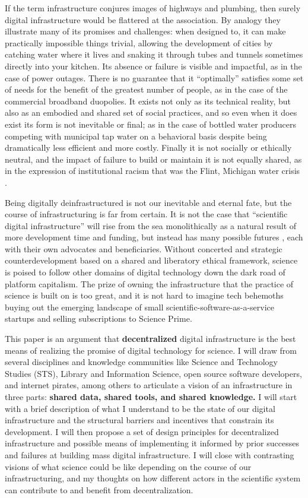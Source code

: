 \documentclass[notoc]{tufte-book}
\begin{document}
If the term infrastructure conjures images of highways and plumbing,
then surely digital infrastructure would be flattered at the
association. By analogy they illustrate many of its promises and
challenges: when designed to, it can make practically impossible things
trivial, allowing the development of cities by catching water where it
lives and snaking it through tubes and tunnels sometimes directly into
your kitchen. Its absence or failure is visible and impactful, as in the
case of power outages. There is no guarantee that it ``optimally''
satisfies some set of needs for the benefit of the greatest number of
people, as in the case of the commercial broadband duopolies. It exists
not only as its technical reality, but also as an embodied and shared
set of social practices, and so even when it does exist its form is not
inevitable or final; as in the case of bottled water producers competing
with municipal tap water on a behavioral basis despite being
dramatically less efficient and more costly. Finally it is not socially
or ethically neutral, and the impact of failure to build or maintain it
is not equally shared, as in the expression of institutional racism that
was the Flint, Michigan water crisis \citep{michicancivilrightscommissionFlintWaterCrisis2017} .

Being digitally deinfrastructured is not our inevitable and eternal
fate, but the course of infrastructuring is far from certain. It is not
the case that ``scientific digital infrastructure'' will rise from the
sea monolithically as a natural result of more development time and
funding, but instead has many possible futures\citep{mirowskiFutureOpenScience2018} , each with their own advocates and
beneficiaries. Without concerted and strategic counterdevelopment based
on a shared and liberatory ethical framework, science is poised to
follow other domains of digital technology down the dark road of
platform capitalism. The prize of owning the infrastructure that the
practice of science is built on is too great, and it is not hard to
imagine tech behemoths buying out the emerging landscape of small
scientific-software-as-a-service startups and selling subscriptions to
Science Prime.

This paper is an argument that \textbf{decentralized} digital
infrastructure is the best means of realizing the promise of digital
technology for science. I will draw from several disciplines and
knowledge communities like Science and Technology Studies (STS), Library
and Information Science, open source software developers, and internet
pirates, among others to articulate a vision of an infrastructure in
three parts: \textbf{shared data, shared tools, and shared knowledge.} I
will start with a brief description of what I understand to be the state
of our digital infrastructure and the structural barriers and incentives
that constrain its development. I will then propose a set of design
principles for decentralized infrastructure and possible means of
implementing it informed by prior successes and failures at building
mass digital infrastructure. I will close with contrasting visions of
what science could be like depending on the course of our
infrastructuring, and my thoughts on how different actors in the
scientific system can contribute to and benefit from decentralization.
\end{document}
